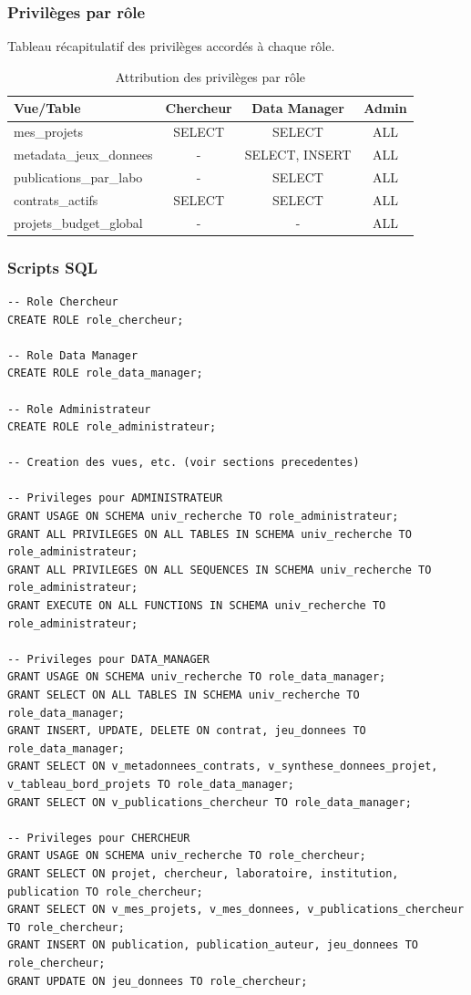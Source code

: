 \documentclass[12pt,a4paper]{article}
\begin{document}
\subsubsection{Privilèges par rôle}
Tableau récapitulatif des privilèges accordés à chaque rôle.

\begin{table}[H]
\centering
\begin{tabular}{@{}lccc@{}}
\toprule
\textbf{Vue/Table} & \textbf{Chercheur} & \textbf{Data Manager} & \textbf{Admin} \\ \midrule
mes\_projets & SELECT & SELECT & ALL \\
metadata\_jeux\_donnees & - & SELECT, INSERT & ALL \\
publications\_par\_labo & - & SELECT & ALL \\
contrats\_actifs & SELECT & SELECT & ALL \\
projets\_budget\_global & - & - & ALL \\ \bottomrule
\end{tabular}
\caption{Attribution des privilèges par rôle}
\label{tab:privileges}
\end{table}

\subsubsection{Scripts SQL}
\begin{lstlisting}[style=sqlstyle, caption=Création des rôles et attribution des privilèges]
-- Role Chercheur
CREATE ROLE role_chercheur;

-- Role Data Manager
CREATE ROLE role_data_manager;

-- Role Administrateur
CREATE ROLE role_administrateur;

-- Creation des vues, etc. (voir sections precedentes)

-- Privileges pour ADMINISTRATEUR
GRANT USAGE ON SCHEMA univ_recherche TO role_administrateur;
GRANT ALL PRIVILEGES ON ALL TABLES IN SCHEMA univ_recherche TO role_administrateur;
GRANT ALL PRIVILEGES ON ALL SEQUENCES IN SCHEMA univ_recherche TO role_administrateur;
GRANT EXECUTE ON ALL FUNCTIONS IN SCHEMA univ_recherche TO role_administrateur;

-- Privileges pour DATA_MANAGER
GRANT USAGE ON SCHEMA univ_recherche TO role_data_manager;
GRANT SELECT ON ALL TABLES IN SCHEMA univ_recherche TO role_data_manager;
GRANT INSERT, UPDATE, DELETE ON contrat, jeu_donnees TO role_data_manager;
GRANT SELECT ON v_metadonnees_contrats, v_synthese_donnees_projet, v_tableau_bord_projets TO role_data_manager;
GRANT SELECT ON v_publications_chercheur TO role_data_manager;

-- Privileges pour CHERCHEUR
GRANT USAGE ON SCHEMA univ_recherche TO role_chercheur;
GRANT SELECT ON projet, chercheur, laboratoire, institution, publication TO role_chercheur;
GRANT SELECT ON v_mes_projets, v_mes_donnees, v_publications_chercheur TO role_chercheur;
GRANT INSERT ON publication, publication_auteur, jeu_donnees TO role_chercheur;
GRANT UPDATE ON jeu_donnees TO role_chercheur;

\end{lstlisting}
\end{document}
